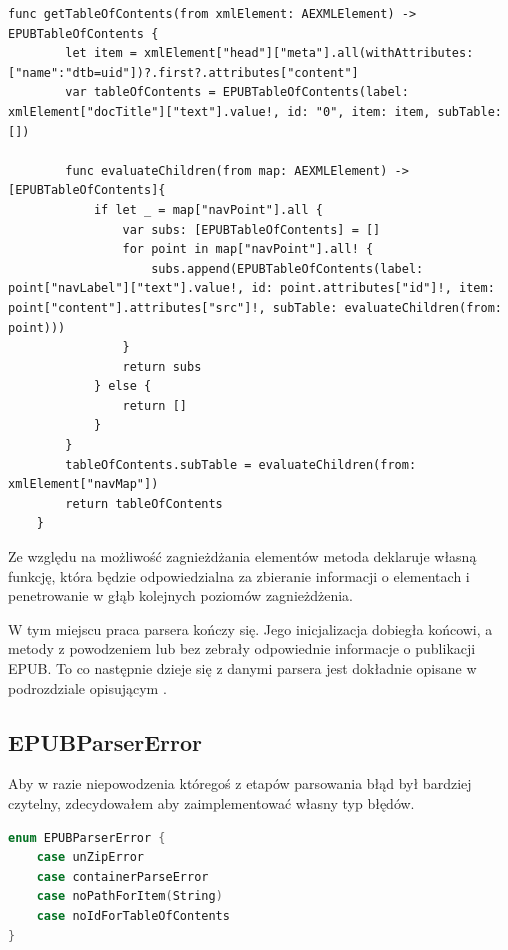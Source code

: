 \begin{lstlisting}[caption={Implementacja metody \texttt{getTableOfContents(from xmlElement:)}},language=swift-reference,label=ioioioio]
    func getTableOfContents(from xmlElement: AEXMLElement) -> EPUBTableOfContents {
        let item = xmlElement["head"]["meta"].all(withAttributes: ["name":"dtb=uid"])?.first?.attributes["content"]
        var tableOfContents = EPUBTableOfContents(label: xmlElement["docTitle"]["text"].value!, id: "0", item: item, subTable: [])

        func evaluateChildren(from map: AEXMLElement) -> [EPUBTableOfContents]{
            if let _ = map["navPoint"].all {
                var subs: [EPUBTableOfContents] = []
                for point in map["navPoint"].all! {
                    subs.append(EPUBTableOfContents(label: point["navLabel"]["text"].value!, id: point.attributes["id"]!, item: point["content"].attributes["src"]!, subTable: evaluateChildren(from: point)))
                }
                return subs
            } else {
                return []
            }
        }
        tableOfContents.subTable = evaluateChildren(from: xmlElement["navMap"])
        return tableOfContents
    }
\end{lstlisting}

Ze względu na możliwość zagnieżdżania elementów metoda deklaruje własną funkcję, która będzie odpowiedzialna za zbieranie informacji o elementach i penetrowanie w głąb kolejnych poziomów zagnieżdżenia.

W tym miejscu praca parsera kończy się. Jego inicjalizacja dobiegła końcowi, a metody z powodzeniem lub bez zebrały odpowiednie informacje o publikacji EPUB. To co następnie dzieje się z danymi parsera jest dokładnie opisane w podrozdziale opisującym .

\subsection{EPUBParserError}

Aby w razie niepowodzenia któregoś z etapów parsowania błąd był bardziej czytelny, zdecydowałem aby zaimplementować własny typ błędów.

\begin{lstlisting}[caption={Enumeracja \texttt{EPUBParserError}},language=swift,label=ertyu]
enum EPUBParserError {
    case unZipError
    case containerParseError
    case noPathForItem(String)
    case noIdForTableOfContents
}
\end{lstlisting}

